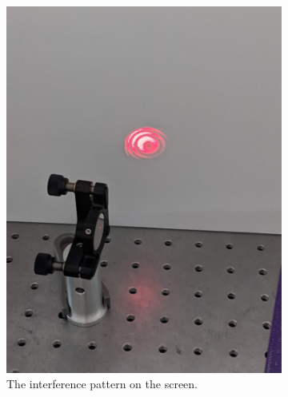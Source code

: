 \documentclass[notitlepage]{report}
\begin{document}
	
	\begin{figure}[p]
		\centering
		\begin{subfigure}[b]{0.49\textwidth}
			\includegraphics[width=\linewidth]{PXL_20210204_220939936}
			\caption{The interference pattern on the screen.}
			\label{fig:interference}
		\end{subfigure}
		\hfill
		\begin{subfigure}[b]{0.49\textwidth}			

\end{subfigure}
\end{figure}
\end{document}
